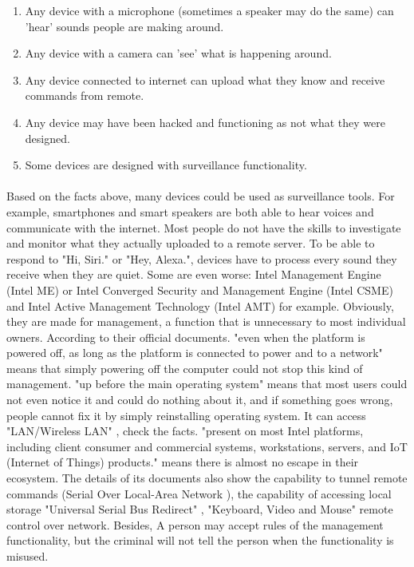 \documentclass[mscthesis]{usiinfthesis}
\begin{document}
\begin{itemlist}[H]
  \begin{enumerate}
    \item Any device with a microphone (sometimes a speaker may do the same) can 'hear' sounds people are making around.
    \item Any device with a camera can 'see' what is happening around.
    \item Any device connected to internet can upload what they know and receive commands from remote.
    \item Any device may have been hacked and functioning as not what they were designed.
    \item Some devices are designed with surveillance functionality.
  \end{enumerate}
\end{itemlist}

\paragraph{}
Based on the facts above, many devices could be used as surveillance tools. For example, smartphones and smart speakers are both able to hear voices and communicate with the internet. Most people do not have the skills to investigate and monitor what they actually uploaded to a remote server. To be able to respond to "Hi, Siri." or "Hey, Alexa.", devices have to process every sound they receive when they are quiet. Some are even worse: Intel Management Engine (Intel ME) or Intel Converged Security and Management Engine (Intel CSME) and Intel Active Management Technology (Intel AMT) for example. Obviously, they are made for management, a function that is unnecessary to most individual owners. According to their official documents. "even when the platform is powered off, as long as the platform is connected to power and to a network" \citep{ime:csmewp} means that simply powering off the computer could not stop this kind of management. "up before the main operating system" \citep{ime:power} means that most users could not even notice it and could do nothing about it, and if something goes wrong, people cannot fix it by simply reinstalling operating system. It can access "LAN/Wireless LAN" \citep{ime:csmewp}, check the facts. "present on most Intel platforms, including client consumer and commercial systems, workstations, servers, and IoT (Internet of Things) products." \citep{ime:csmewp} means there is almost no escape in their ecosystem. The details of its documents also show the capability to tunnel remote commands (Serial Over Local-Area Network \citep{ime:csmewp}), the capability of accessing local storage "Universal Serial Bus Redirect" \citep{ime:csmewp}, "Keyboard, Video and Mouse" \citep{ime:csmewp} remote control over network. Besides, A person may accept rules of the management functionality, but the criminal will not tell the person when the functionality is misused.
\end{document}
